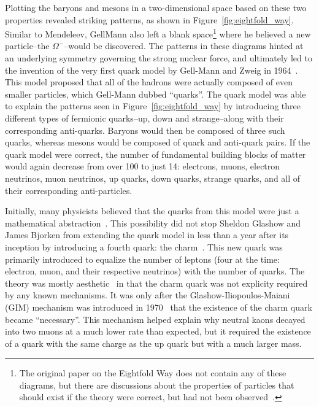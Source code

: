Plotting the baryons and mesons in a two-dimensional space based on these two properties revealed striking patterns, as shown in Figure~\ref{fig:eightfold_way}. Similar to Mendeleev, GellMann also left a blank space\footnote{The original paper on the Eightfold Way does not contain any of these diagrams, but there are discussions about the properties of particles that should exist if the theory were correct, but had not been observed~\cite{GellMannEightfold}.} where he believed a new particle--the $\Omega^{-}$--would be discovered.  The patterns in these diagrams hinted at an underlying symmetry governing the strong nuclear force, and ultimately led to the invention of the very first quark model by Gell-Mann and Zweig in 1964~\cite{QuarkModel}. This model proposed that all of the hadrons were actually composed of even smaller particles, which Gell-Mann dubbed ``quarks''. The quark model was able to explain the patterns seen in Figure~\ref{fig:eightfold_way} by introducing three different types of fermionic quarks--up, down and strange--along with their corresponding anti-quarks. Baryons would then be composed of three such quarks, whereas mesons would be composed of quark and anti-quark pairs. If the quark model were correct, the number of fundamental building blocks of matter would again decrease from over 100 to just 14: electrons, muons, electron neutrinos, muon neutrinos, up quarks, down quarks, strange quarks, and all of their corresponding anti-particles.


Initially, many physicists believed that the quarks from this model were just a mathematical abstraction~\cite{QuarkAbstraction}. This possibility did not stop Sheldon Glashow and James Bjorken from extending the quark model in less than a year after its inception by introducing a fourth quark: the charm~\cite{CharmQuark}. This new quark was primarily introduced to equalize the number of leptons (four at the time: electron, muon, and their respective neutrinos) with the number of quarks. The theory was mostly aesthetic~\cite{AestheticCharm} in that the charm quark was not explicity required by any known mechanisms. It was only after the Glashow-Iliopoulos-Maiani (GIM) mechanism was introduced in 1970~\cite{GIM} that the existence of the charm quark became ``necessary''. This mechanism helped explain why neutral kaons decayed into two muons at a much lower rate than expected, but it required the existence of a quark with the same charge as the up quark but with a much larger mass.

